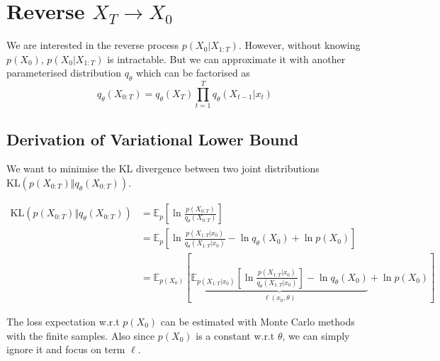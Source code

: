 \section{Reverse $X_T \rightarrow X_0$}
We are interested in the reverse process $p(X_0 \vert X_{1:T})$. However, without knowing $p(X_0)$, $p(X_0 \vert X_{1:T})$ is intractable. But we can approximate it with another parameterised distribution $q_{\theta}$ which can be factorised as $$
q_\theta(X_{0:T}) = q_\theta(X_T) \prod_{t=1}^{T} q_\theta(X_{t-1} \vert x_t)
$$


\subsection{Derivation of Variational Lower Bound}
We want to minimise the KL divergence between two joint distributions $\mathrm{KL}\left(p(X_{0:T}) \Vert q_\theta(X_{0:T}) \right)$. 

\begin{align*}
    \mathrm{KL}\left(p(X_{0:T}) \Vert q_\theta(X_{0:T}) \right)
    &= \mathbb{E}_p \left[\ln \frac{p(X_{0:T})}{q_\theta(X_{0:T})} \right] \\
    &= \mathbb{E}_p \left[\ln \frac{p(X_{1:T}  \vert x_0)}{q_\theta(X_{1:T} \vert x_0)} -\ln q_\theta(X_0) + \ln p(X_0) \right] \\
    &= \mathbb{E}_{p(X_0)} \left[ \underbrace{
    \mathbb{E}_{p(X_{1:T} \vert x_0)} \left[\ln \frac{p(X_{1:T}  \vert x_0)}{q_\theta(X_{1:T} \vert x_0)} \right] - \ln q_\theta(X_0)
    }_{\ell(x_0, \theta)} + \ln p(X_0) \right]
\end{align*}

The loss expectation w.r.t $p(X_0)$ can be estimated with Monte Carlo methods with the finite samples. Also since $p(X_0)$ is a constant w.r.t $\theta$, we can simply ignore it and focus on term $\ell$.

